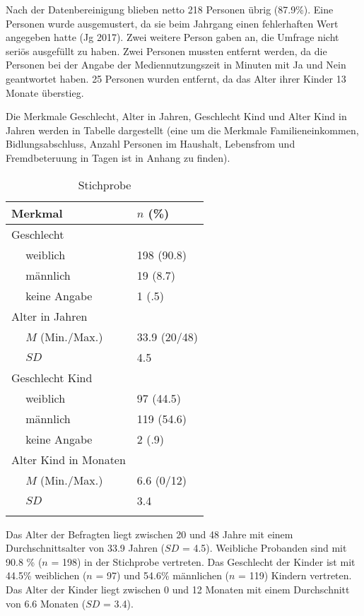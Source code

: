 Nach der Datenbereinigung blieben netto 218 Personen übrig (87.9\%). Eine Personen wurde ausgemustert, da sie beim Jahrgang einen fehlerhaften Wert angegeben hatte (Jg 2017). Zwei weitere Person gaben an, die Umfrage nicht seriös ausgefüllt zu haben. Zwei Personen mussten entfernt werden, da die Personen bei der Angabe der Mediennutzungszeit in Minuten mit Ja und Nein geantwortet haben. 25 Personen wurden entfernt, da das Alter ihrer Kinder 13 Monate überstieg. 

Die Merkmale Geschlecht, Alter in Jahren, Geschlecht Kind und Alter Kind in Jahren werden in Tabelle  dargestellt (eine um die Merkmale Familieneinkommen, Bidlungsabschluss, Anzahl Personen im Haushalt, Lebensfrom und Fremdbeteruung in Tagen ist in Anhang  zu finden).

\begin{table}[htbp]

\begin{tabular}{m{0.5em}  m{10em}  m{5em}} 
  \hline\hline
  \multicolumn{2}{l}{\textbf{Merkmal}} & \textbf{$n$ (\%)} \\
  \hline
  \multicolumn{2}{l}{Geschlecht} \\ 
   & weiblich & 198 (90.8)\\ 
   & männlich & 19 (8.7)\\ 
   & keine Angabe & 1 (.5)\\ 
   
  \multicolumn{2}{l}{Alter in Jahren} \\
   & $M$ (Min./Max.) & 33.9 (20/48) \\
   & $SD$ & 4.5 \\
  
  \multicolumn{2}{l}{Geschlecht Kind} \\
   & weiblich & 97 (44.5)\\ 
   & männlich & 119 (54.6)\\ 
   & keine Angabe & 2 (.9)\\
  
  \multicolumn{2}{l}{Alter Kind in Monaten} \\
   &  $M$ (Min./Max.) & 6.6 (0/12)\\
   & $SD$ & 3.4\\
  \hline\hline
  &&\\
\end{tabular}
\caption{Stichprobe}
\label{table:Stichprobe}
\end{table}

Das Alter der Befragten liegt zwischen 20 und 48 Jahre mit einem Durchschnittsalter von 33.9 Jahren ($SD$ = 4.5). Weibliche Probanden sind mit 90.8 \% ($n$ = 198) in der Stichprobe vertreten. Das Geschlecht der Kinder ist mit 44.5\% weiblichen ($n$ = 97) und 54.6\% männlichen ($n$ = 119) Kindern vertreten. Das Alter der Kinder liegt zwischen 0 und 12 Monaten mit einem Durchschnitt von 6.6 Monaten ($SD$ = 3.4).

